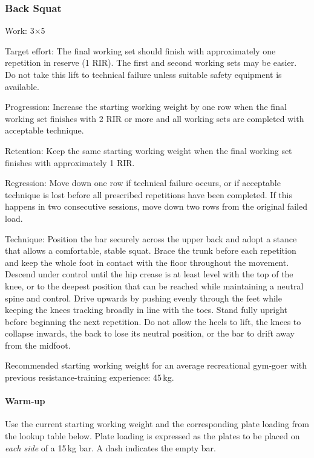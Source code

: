 \documentclass[11pt,a4paper]{article}
\begin{document}
\newpage
\subsubsection{Back Squat}

Work: 3$\times$5

Target effort: The final working set should finish with approximately one repetition in reserve (1 RIR). The first and second working sets may be easier. Do not take this lift to technical failure unless suitable safety equipment is available.

Progression: Increase the starting working weight by one row when the final working set finishes with 2 RIR or more and all working sets are completed with acceptable technique.

Retention: Keep the same starting working weight when the final working set finishes with approximately 1 RIR.

Regression: Move down one row if technical failure occurs, or if acceptable technique is lost before all prescribed repetitions have been completed. If this happens in two consecutive sessions, move down two rows from the original failed load.

Technique: Position the bar securely across the upper back and adopt a stance that allows a comfortable, stable squat. Brace the trunk before each repetition and keep the whole foot in contact with the floor throughout the movement. Descend under control until the hip crease is at least level with the top of the knee, or to the deepest position that can be reached while maintaining a neutral spine and control. Drive upwards by pushing evenly through the feet while keeping the knees tracking broadly in line with the toes. Stand fully upright before beginning the next repetition. Do not allow the heels to lift, the knees to collapse inwards, the back to lose its neutral position, or the bar to drift away from the midfoot.

Recommended starting working weight for an average recreational gym-goer with previous resistance-training experience: 45\,kg.

\paragraph{Warm-up}

Use the current starting working weight and the corresponding plate loading from the lookup table below. Plate loading is expressed as the plates to be placed on \emph{each side} of a 15\,kg bar. A dash indicates the empty bar.
\end{document}
